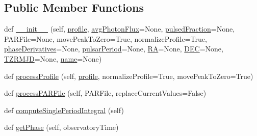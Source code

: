 \subsection*{Public Member Functions}
\begin{DoxyCompactItemize}
\item 
def \hyperlink{classmodest_1_1signals_1_1poissonsource_1_1PeriodicPoissonSource_a3df6078d9f6f0149bb4f749796b804e5}{\+\_\+\+\_\+init\+\_\+\+\_\+} (self, \hyperlink{classmodest_1_1signals_1_1poissonsource_1_1PeriodicPoissonSource_af057537ab956e1eb3bbeadd90bbe0aa9}{profile}, \hyperlink{classmodest_1_1signals_1_1poissonsource_1_1PeriodicPoissonSource_a79f9634be78f18e34daa792eb4742944}{avg\+Photon\+Flux}=None, \hyperlink{classmodest_1_1signals_1_1poissonsource_1_1PeriodicPoissonSource_adf39e84e02a1f4c98f4850853bca4d87}{pulsed\+Fraction}=None, P\+A\+R\+File=None, move\+Peak\+To\+Zero=True, normalize\+Profile=True, \hyperlink{classmodest_1_1signals_1_1poissonsource_1_1PeriodicPoissonSource_ae30b60a8e1f92e1172041cd1fd267df8}{phase\+Derivatives}=None, \hyperlink{classmodest_1_1signals_1_1poissonsource_1_1PeriodicPoissonSource_a602c543f1a87a280ea021748fb2d8b84}{pulsar\+Period}=None, \hyperlink{classmodest_1_1signals_1_1poissonsource_1_1PeriodicPoissonSource_a90c55d8278f10578bea87ea3547d08df}{RA}=None, \hyperlink{classmodest_1_1signals_1_1poissonsource_1_1PeriodicPoissonSource_a95791605e905e3f7af360d500e23e6a8}{D\+EC}=None, \hyperlink{classmodest_1_1signals_1_1poissonsource_1_1PeriodicPoissonSource_a98bc97a480e5b3f11c337644ad409b4c}{T\+Z\+R\+M\+JD}=None, \hyperlink{classmodest_1_1signals_1_1poissonsource_1_1PeriodicPoissonSource_a98cec694ca2d85c09b1f0c4d93081384}{name}=None)
\item 
def \hyperlink{classmodest_1_1signals_1_1poissonsource_1_1PeriodicPoissonSource_a89540e48e757dcdc4895dc030e9c3ca5}{process\+Profile} (self, \hyperlink{classmodest_1_1signals_1_1poissonsource_1_1PeriodicPoissonSource_af057537ab956e1eb3bbeadd90bbe0aa9}{profile}, normalize\+Profile=True, move\+Peak\+To\+Zero=True)
\item 
def \hyperlink{classmodest_1_1signals_1_1poissonsource_1_1PeriodicPoissonSource_a280db13f5c2cd6db115ce2f8aa4694f0}{process\+P\+A\+R\+File} (self, P\+A\+R\+File, replace\+Current\+Values=False)
\item 
def \hyperlink{classmodest_1_1signals_1_1poissonsource_1_1PeriodicPoissonSource_a6845554a07a57d987e1e864c3076a44a}{compute\+Single\+Period\+Integral} (self)
\item 
def \hyperlink{classmodest_1_1signals_1_1poissonsource_1_1PeriodicPoissonSource_a1b0f5c2757455f7f6da7e32dbb8ab46a}{get\+Phase} (self, observatory\+Time)

\end{DoxyCompactItemize}
